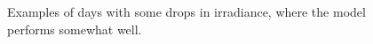 \begin{figure}[ht!]
    \qquad
    \caption{Examples of days with some drops in irradiance, where the model performs somewhat well.
    \label{fig:full_med_med}}
\end{figure}

